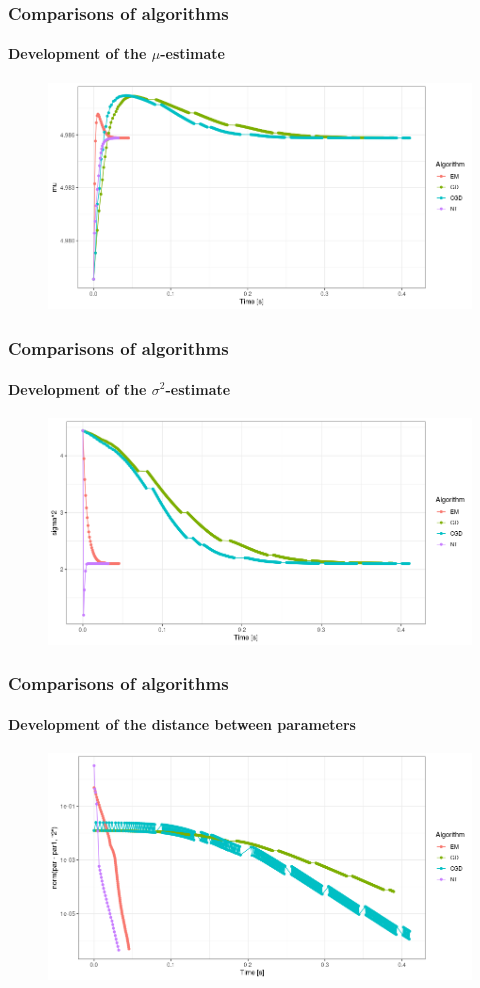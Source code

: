 \documentclass[aspectratio=169]{beamer}
\begin{document}
\begin{frame}
    \frametitle{Comparisons of algorithms}
    \framesubtitle{Development of the $\mu$-estimate}
    \begin{figure}
        \centering
        \includegraphics[scale = 0.4]{pictures/NewComp/AllMuNu0_5.png}
    \end{figure}
\end{frame}
\begin{frame}
    \frametitle{Comparisons of algorithms}
    \framesubtitle{Development of the $\sigma^{2}$-estimate}
    \begin{figure}
        \centering
        \includegraphics[scale = 0.4]{pictures/NewComp/AllSigmaNu0_5.png}
    \end{figure}
\end{frame}
\begin{frame}
    \frametitle{Comparisons of algorithms}
    \framesubtitle{Development of the distance between parameters}
    \begin{figure}
        \centering
        \includegraphics[scale = 0.4]{pictures/NewComp/AllNormNu0_5.png}
    \end{figure}
\end{frame}
\end{document}

